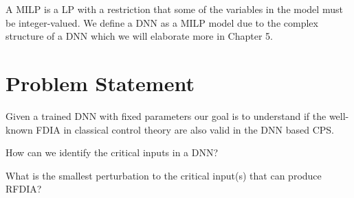 A \ac{MILP} is a \ac{LP} with a restriction that some of the variables in the model must be integer-valued. 
We define a \ac{DNN} as a \ac{MILP} model due to the complex structure of a \ac{DNN} which we will elaborate more in Chapter 5. 



\section{Problem Statement}

Given a trained DNN with fixed parameters our goal is to understand if the well-known \ac*{FDIA} in classical control theory are also valid in the DNN based CPS.
\begin{problem}
	How can we identify the critical inputs in a DNN?
\end{problem}

\begin{problem}
	What is the smallest perturbation to the critical input(s) that can produce \ac{RFDIA}?
\end{problem}




